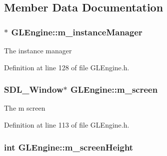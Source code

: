 \subsection{Member Data Documentation}
\subsubsection[{\texorpdfstring{m\+\_\+instance\+Manager}{m_instanceManager}}]{$\ast$ G\+L\+Engine\+::m\+\_\+instance\+Manager\hspace{0.3cm}{\ttfamily [private]}}\hypertarget{class_g_l_engine_a2c0f71644e63fe4e76b809207d7d7d0a}{}\label{class_g_l_engine_a2c0f71644e63fe4e76b809207d7d7d0a}


The instance manager 



Definition at line 128 of file G\+L\+Engine.\+h.

\subsubsection[{\texorpdfstring{m\+\_\+screen}{m_screen}}]{\setlength{\rightskip}{0pt plus 5cm}S\+D\+L\+\_\+\+Window$\ast$ G\+L\+Engine\+::m\+\_\+screen\hspace{0.3cm}{\ttfamily [private]}}\hypertarget{class_g_l_engine_ac7bf2bf114dfb36884012993fd711b3f}{}\label{class_g_l_engine_ac7bf2bf114dfb36884012993fd711b3f}


The m screen 



Definition at line 113 of file G\+L\+Engine.\+h.

\subsubsection[{\texorpdfstring{m\+\_\+screen\+Height}{m_screenHeight}}]{\setlength{\rightskip}{0pt plus 5cm}int G\+L\+Engine\+::m\+\_\+screen\+Height\hspace{0.3cm}{\ttfamily [private]}}\hypertarget{class_g_l_engine_a18ac40a2dc119a5e2b2bc08e588016fe}{}\label{class_g_l_engine_a18ac40a2dc119a5e2b2bc08e588016fe}


